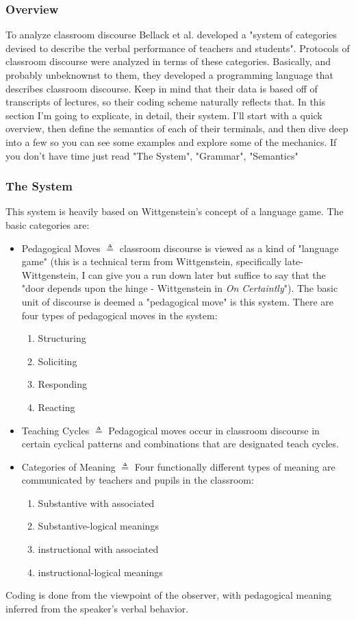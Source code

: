 \documentclass[10pt, letterpaper]{article}
\begin{document}
\subsubsection*{Overview}
\label{sec:orga3d0c56}
To analyze classroom discourse Bellack et al. developed a "system of categories devised to describe the verbal performance of teachers and students". Protocols of classroom discourse were analyzed in terms of these categories. Basically, and probably unbeknownst to them, they developed a programming language that describes classroom discourse. Keep in mind that their data is based off of transcripts of lectures, so their coding scheme naturally reflects that. In this section I'm going to explicate, in detail, their system. I'll start with a quick overview, then define the semantics of each of their terminals, and then dive deep into a few so you can see some examples and explore some of the mechanics. If you don't have time just read "The System", "Grammar", "Semantics"
\subsubsection*{The System}
\label{sec:org6d8edf4}
This system is heavily based on Wittgenstein's concept of a language game. The basic categories are:
\begin{itemize}
\item Pedagogical Moves \(\triangleq\) classroom discourse is viewed as a kind of "language game" (this is a technical term from Wittgenstein, specifically late-Wittgenstein, I can give you a run down later but suffice to say that the "door depends upon the hinge - Wittgenstein in \emph{On Certaintly}"). The basic unit of discourse is deemed a "pedagogical move" is this system. There are four types of pedagogical moves in the system:
\begin{enumerate}
\item Structuring
\item Soliciting
\item Responding
\item Reacting
\end{enumerate}
\item Teaching Cycles \(\triangleq\) Pedagogical moves occur in classroom discourse in certain cyclical patterns and combinations that are designated teach cycles.
\item Categories of Meaning \(\triangleq\) Four functionally different types of meaning are communicated by teachers and pupils in the classroom:
\begin{enumerate}
\item Substantive with associated
\item Substantive-logical meanings
\item instructional with associated
\item instructional-logical meanings
\end{enumerate}
\end{itemize}
Coding is done from the viewpoint of the observer, with pedagogical meaning inferred from the speaker's verbal behavior. 
\end{document}
